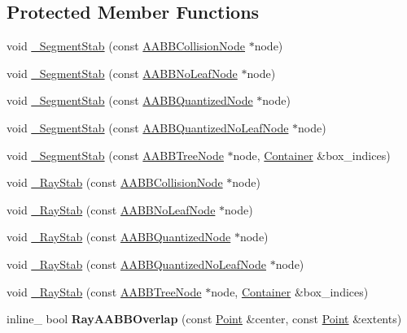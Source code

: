 \subsection*{Protected Member Functions}
\begin{DoxyCompactItemize}
\item 
void \hyperlink{classOpcode_1_1RayCollider_a28bde613a20d7ea5e5c35cf15dca8fe2}{\+\_\+\+Segment\+Stab} (const \hyperlink{classOpcode_1_1AABBCollisionNode}{A\+A\+B\+B\+Collision\+Node} $\ast$node)
\item 
void \hyperlink{classOpcode_1_1RayCollider_a23f794feebb071e7452aaa9dde4a3ca0}{\+\_\+\+Segment\+Stab} (const \hyperlink{classOpcode_1_1AABBNoLeafNode}{A\+A\+B\+B\+No\+Leaf\+Node} $\ast$node)
\item 
void \hyperlink{classOpcode_1_1RayCollider_a698d20424736b8815d73c3d6484a4cb4}{\+\_\+\+Segment\+Stab} (const \hyperlink{classOpcode_1_1AABBQuantizedNode}{A\+A\+B\+B\+Quantized\+Node} $\ast$node)
\item 
void \hyperlink{classOpcode_1_1RayCollider_a7443465674a4cbe25624334505225ddd}{\+\_\+\+Segment\+Stab} (const \hyperlink{classOpcode_1_1AABBQuantizedNoLeafNode}{A\+A\+B\+B\+Quantized\+No\+Leaf\+Node} $\ast$node)
\item 
void \hyperlink{classOpcode_1_1RayCollider_a5bba90be44ff9c54ee9fc8ee6f66166d}{\+\_\+\+Segment\+Stab} (const \hyperlink{classOpcode_1_1AABBTreeNode}{A\+A\+B\+B\+Tree\+Node} $\ast$node, \hyperlink{classContainer}{Container} \&box\+\_\+indices)
\item 
void \hyperlink{classOpcode_1_1RayCollider_a94e3758f40ce3b19ce649c8a2c85f3ad}{\+\_\+\+Ray\+Stab} (const \hyperlink{classOpcode_1_1AABBCollisionNode}{A\+A\+B\+B\+Collision\+Node} $\ast$node)
\item 
void \hyperlink{classOpcode_1_1RayCollider_adeb4a3ed0e9e7fc7f1e0253dcd84b24c}{\+\_\+\+Ray\+Stab} (const \hyperlink{classOpcode_1_1AABBNoLeafNode}{A\+A\+B\+B\+No\+Leaf\+Node} $\ast$node)
\item 
void \hyperlink{classOpcode_1_1RayCollider_a2835165217934080ee7d539d504f99ff}{\+\_\+\+Ray\+Stab} (const \hyperlink{classOpcode_1_1AABBQuantizedNode}{A\+A\+B\+B\+Quantized\+Node} $\ast$node)
\item 
void \hyperlink{classOpcode_1_1RayCollider_a9c024f82fff85b1cdbfaab39db03ace7}{\+\_\+\+Ray\+Stab} (const \hyperlink{classOpcode_1_1AABBQuantizedNoLeafNode}{A\+A\+B\+B\+Quantized\+No\+Leaf\+Node} $\ast$node)
\item 
void \hyperlink{classOpcode_1_1RayCollider_a25a46381bd2d1c242dffb7c49a4d4bd6}{\+\_\+\+Ray\+Stab} (const \hyperlink{classOpcode_1_1AABBTreeNode}{A\+A\+B\+B\+Tree\+Node} $\ast$node, \hyperlink{classContainer}{Container} \&box\+\_\+indices)
\item 
inline\+\_\+ bool {\bfseries Ray\+A\+A\+B\+B\+Overlap} (const \hyperlink{classOpcode_1_1Point}{Point} \&center, const \hyperlink{classOpcode_1_1Point}{Point} \&extents)\hypertarget{classOpcode_1_1RayCollider_abec25c20a43ae532bb94b586983d4cc3}{}\label{classOpcode_1_1RayCollider_abec25c20a43ae532bb94b586983d4cc3}


\end{DoxyCompactItemize}

